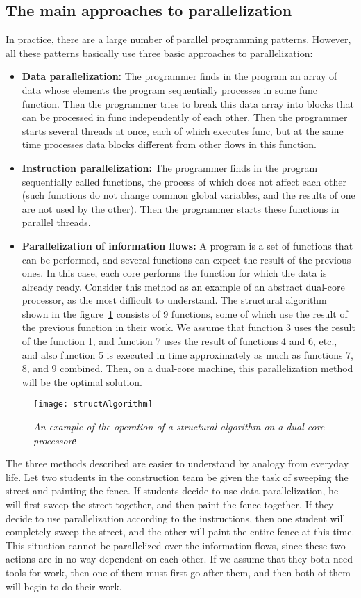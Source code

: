 { %
	\subsection{The main approaches to parallelization}
	\par In practice, there are a large number of parallel programming patterns. However, all these patterns basically use three basic approaches to parallelization:
	\begin{itemize}
		\item\textbf{Data parallelization:} The programmer finds in the program an array of data whose elements the program sequentially processes in some func function. Then the programmer tries to break this data array into blocks that can be processed in func independently of each other. Then the programmer starts several threads at once, each of which executes func, but at the same time processes data blocks different from other flows in this function.
		\item\textbf{Instruction parallelization:} The programmer finds in the program sequentially called functions, the process of which does not affect each other (such functions do not change common global variables, and the results of one are not used by the other). Then the programmer starts these functions in parallel threads.
		\item\textbf{Parallelization of information flows:} A program is a set of functions that can be performed, and several functions can expect the result of the previous ones. In this case, each core performs the function for which the data is already ready. Consider this method as an example of an abstract dual-core processor, as the most difficult to understand. The structural algorithm shown in the figure~\ref{structAlgorithm:image} consists of 9 functions, some of which use the result of the previous function in their work. We assume that function 3 uses the result of the function 1, and function 7 uses the result of functions 4 and 6, etc., and also function 5 is executed in time approximately as much as functions 7, 8, and 9 combined. Then, on a dual-core machine, this parallelization method will be the optimal solution.
	\end{itemize}
	\begin{figure}[H]
		\texttt{[image: structAlgorithm]}
		\caption{\textit{An example of the operation of a structural algorithm on a dual-core processorе}}
		\label{structAlgorithm:image}
	\end{figure}
	\par The three methods described are easier to understand by analogy from everyday life. Let two students in the construction team be given the task of sweeping the street and painting the fence. If students decide to use data parallelization, he will first sweep the street together, and then paint the fence together. If they decide to use parallelization according to the instructions, then one student will completely sweep the street, and the other will paint the entire fence at this time. This situation cannot be parallelized over the information flows, since these two actions are in no way dependent on each other. If we assume that they both need tools for work, then one of them must first go after them, and then both of them will begin to do their work.
}
